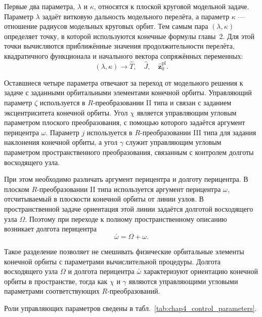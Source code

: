 Первые два параметра, \(\lambda\) и \(\kappa\), относятся к плоской круговой модельной задаче. Параметр \(\lambda\) задаёт витковую дальность модельного перелёта, а параметр \(\kappa\) --- отношение радиусов модельных круговых орбит. Тем самым пара \((\lambda,\kappa)\) определяет точку, в которой используются конечные формулы главы~2. Для этой точки вычисляются приближённые значения продолжительности перелёта, квадратичного функционала и начального вектора сопряжённых переменных:
\begin{equation}
	(\lambda,\kappa)
	\longrightarrow
	\widehat T,\quad
	\widehat J,\quad
	\widehat{\mathbf z}^{\mathrm{pl}}_0 .
\end{equation}

Оставшиеся четыре параметра отвечают за переход от модельного решения к задаче с заданными орбитальными элементами конечной орбиты. Управляющий параметр \(\zeta\) используется в \(R\)-преобразовании II типа и связан с заданием эксцентриситета конечной орбиты. Угол \(\chi\) является управляющим угловым параметром плоского преобразования, с помощью которого задаётся аргумент перицентра \(\omega\). Параметр \(j\) используется в \(R\)-преобразовании III типа для задания наклонения конечной орбиты, а угол \(\gamma\) служит управляющим угловым параметром пространственного преобразования, связанным с контролем долготы восходящего узла.

При этом необходимо различать аргумент перицентра и долготу перицентра. В плоском \(R\)-преобразовании II типа используется аргумент перицентра \(\omega\), отсчитываемый в плоскости конечной орбиты от линии узлов. В пространственной задаче ориентация этой линии задаётся долготой восходящего узла \(\Omega\). Поэтому при переходе к полному пространственному описанию возникает долгота перицентра
\begin{equation}
	\bar{\omega}=\Omega+\omega .
\end{equation}

Такое разделение позволяет не смешивать физические орбитальные элементы конечной орбиты с параметрами вычислительной процедуры. Долгота восходящего узла \(\Omega\) и долгота перицентра \(\bar{\omega}\) характеризуют ориентацию конечной орбиты в пространстве, тогда как \(\chi\) и \(\gamma\) являются управляющими угловыми параметрами соответствующих \(R\)-преобразований.

Роли управляющих параметров сведены в табл.~\ref{tab:chap4_control_parameters}.

